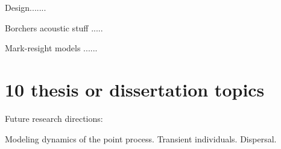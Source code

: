 \begin{comment}

Strauss paper....beth currently working on this 

In currently developing work, we propose a model that accounts for spatial variation in home range density and potential interactions between individuals' home ranges.  This model lets the activity centers follow an inhomogeneous Strauss process \citep{strauss:1975,handbook:2010}, which allows for spatial variation in the home range intensity, and includes a parameter that determines the strength of repulsion between home ranges.  We show via a simulation study that properly accounting for interactions between individuals can provide a substantial improvement in estimating population size.  For simulated data generated with interaction, the usual independence model has a significant bias for the population size, and generally has larger uncertainty for the population size than the proposed Strauss process model.

While the Strauss model is intuitive and shows great potential, it presents computational challenges.  First, the likelihood includes a high-dimensional integral that has no closed form.   Extending related work for categorical Markov random fields \citep{green:2002,smith:2006}, we develop an approximation to the Strauss likelihood which allows for posterior sampling.  Second, in our Bayesian analysis, the population size is treated as an unknown parameter to be updated using the data.  As the population size varies, so does the dimension of the likelihood, and thus the posterior.  We overcome this dimension-changing problem using an auxiliary variable scheme in the Markov chain Monte Carlo algorithm.  Our analysis of simulated data verifies that this computational approach leads to reliable inference.

\end{comment}




Design.......

Borchers acoustic stuff .....

Mark-resight models ......


\section{10 thesis or dissertation topics}

Future research directions:

Modeling dynamics of the point process. Transient individuals. 
Dispersal. 

